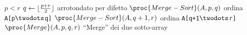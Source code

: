 \begin{codebox}
\li \If $p < r$
\li     \Then
            $q \gets \lfloor\frac{p + r}{2}\rfloor$ 
        \Comment arrotondato per difetto
\li         $\proc{Merge-Sort}(A,p,q)$
        \Comment ordina \texttt{A[p$\twodots$q]}
\li         $\proc{Merge-Sort}(A,q+1,r)$
        \Comment ordina \texttt{A[q+1$\twodots$r]}
\li         $\proc{Merge}(A,p,q,r)$
        \Comment ``Merge'' dei due sotto-array 
        \End
\end{codebox}